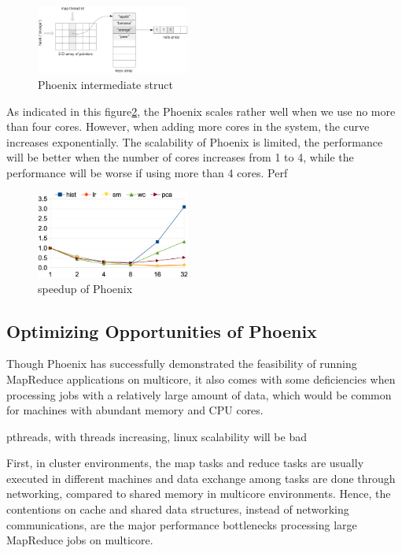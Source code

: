 \begin{figure}[!h!t]  
    \centering
    \includegraphics[width=0.45\textwidth]{eps/phoenix_intermediate.eps}
    \caption{Phoenix intermediate struct}
    \label{fig:phoenix:intermediate}
\end{figure}

As indicated in this figure\ref{fig:phoenix:speedup}, 
the Phoenix scales rather well when we use no more than four cores. 
However, when adding more cores in the system, 
the curve increases exponentially. 
The scalability of Phoenix is limited, the performance will be
better when the number of cores increases from 1 to 4, 
while the performance will be worse if using more than 4 cores. 
Perf\cite{} 


\begin{figure}[!h!t]  
    \centering
    \includegraphics[width=0.45\textwidth]{eps/phoenix_speedup.eps}
    \caption{speedup of Phoenix}
    \label{fig:phoenix:speedup}
\end{figure}


\subsection{Optimizing Opportunities of Phoenix}
Though Phoenix has successfully demonstrated the feasibility
of running MapReduce applications on multicore, 
it also comes with some deficiencies when processing jobs with a relatively large
amount of data, which would be common for machines with abundant memory and CPU cores.



{\color{blue} pthreads, with threads increasing, linux scalability will be bad}

First, in cluster environments, 
the map tasks and reduce tasks are usually 
executed in different machines and data exchange among
tasks are done through networking, 
compared to shared memory in multicore environments. 
Hence, the contentions on cache and shared data structures, 
instead of networking communications, 
are the major performance bottlenecks processing large MapReduce jobs on multicore.

